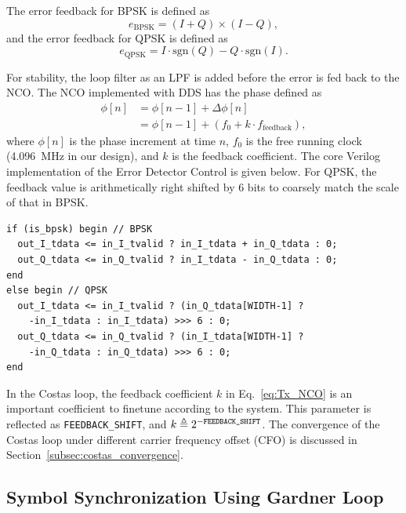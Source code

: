 \documentclass[journal,twoside]{IEEEtran}
\begin{document}
      The error feedback for BPSK is defined as
      \begin{equation}
        e_{\text{BPSK}}=(I+Q)\times(I-Q),
      \end{equation}
      and the error feedback for QPSK is defined as
      \begin{equation}
        e_{\text{QPSK}}=I\cdot\mathrm{sgn}(Q)-Q\cdot\mathrm{sgn}(I).
      \end{equation}

      For stability, the loop filter as an LPF is added before the error is fed back to the NCO.     
      The NCO implemented with DDS has the phase defined as
      \begin{equation}\label{eq:Tx_NCO}
        \begin{aligned}
          \phi[n]&=\phi[n-1]+\Delta\phi[n]\\
          &=\phi[n-1]+(f_0+k\cdot f_{\text{feedback}}),
        \end{aligned}
      \end{equation}
      where $\phi[n]$ is the phase increment at time $n$,
      $f_0$ is the free running clock (\qty{4.096}{MHz} in our design),
      and $k$ is the feedback coefficient.
      The core Verilog implementation of the Error Detector Control is given below.
      For QPSK, the feedback value is arithmetically right shifted by 6 bits
      to coarsely match the scale of that in BPSK.
      \begin{verbatim}
if (is_bpsk) begin // BPSK
  out_I_tdata <= in_I_tvalid ? in_I_tdata + in_Q_tdata : 0;
  out_Q_tdata <= in_Q_tvalid ? in_I_tdata - in_Q_tdata : 0;
end
else begin // QPSK
  out_I_tdata <= in_I_tvalid ? (in_Q_tdata[WIDTH-1] ?
    -in_I_tdata : in_I_tdata) >>> 6 : 0;
  out_Q_tdata <= in_Q_tvalid ? (in_I_tdata[WIDTH-1] ?
    -in_Q_tdata : in_Q_tdata) >>> 6 : 0;
end
      \end{verbatim}
      
      In the Costas loop,
      the feedback coefficient $k$ in Eq.~\eqref{eq:Tx_NCO}
      is an important coefficient to finetune according to the system.
      This parameter is reflected as \texttt{FEEDBACK\_SHIFT}, and $k\triangleq2^{-\text{\texttt{FEEDBACK\_SHIFT}}}$.
      The convergence of the Costas loop under different carrier frequency offset (CFO) is discussed in Section~\ref{subsec:costas_convergence}.

    \subsection{Symbol Synchronization Using Gardner Loop}
\end{document}
